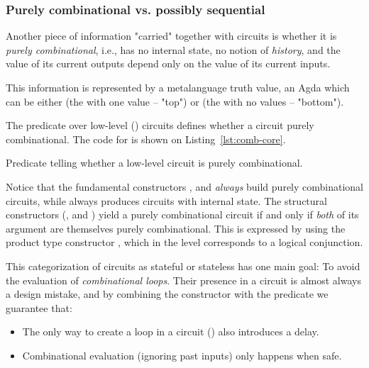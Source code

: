             \subsubsection{Purely combinational vs. possibly sequential}
            Another piece of information "carried" together with circuits is whether it is
            \emph{purely combinational}, i.e., has no internal state, no notion of \emph{history},
            and the value of its current outputs depend only on the value of its current inputs.

            This information is represented by a metalanguage truth value,
            an Agda  which can be either  (the  with one value – "top") or
             (the  with no values – "bottom").

            The predicate  over low-level () circuits defines whether a circuit purely combinational.
            The code for  is shown on Listing~\ref{lst:comb-core}.

            \begin{listing}[ht]
                \caption{Predicate telling whether a low-level circuit is purely combinational.\label{lst:comb-core}}
            \end{listing}

            Notice that the fundamental constructors ,  and  \emph{always}
            build purely combinational circuits, while  always produces circuits with internal state.
            The structural constructors (,  and )
            yield a purely combinational circuit if and only if \emph{both} of its argument are themselves purely combinational.
            This is expressed by using the product type constructor , which in the 
            level corresponds to a logical conjunction.

            This categorization of circuits as stateful or stateless has one main goal:
            To avoid the evaluation of \emph{combinational loops}.
            Their presence in a circuit is almost always a design mistake, and by combining
            the  constructor with the  predicate we guarantee that:

            \begin{itemize}
                \item The only way to create a loop in a circuit () also introduces a delay.
                \item Combinational evaluation (ignoring past inputs) only happens when safe.
            \end{itemize}


